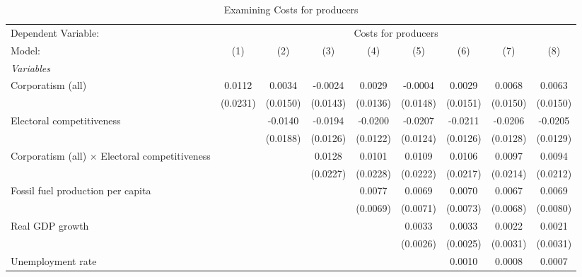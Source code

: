 
\begin{table}[htbp]
   \caption{Examining Costs for producers}
   \centering
   \begin{tabular}{lcccccccc}
      \tabularnewline \midrule \midrule
      Dependent Variable: & \multicolumn{8}{c}{Costs for producers}\\
      Model:                                                & (1)      & (2)      & (3)      & (4)      & (5)      & (6)      & (7)      & (8)\\  
      \midrule
      \emph{Variables}\\
      Corporatism (all)                                     & 0.0112   & 0.0034   & -0.0024  & 0.0029   & -0.0004  & 0.0029   & 0.0068   & 0.0063\\   
                                                            & (0.0231) & (0.0150) & (0.0143) & (0.0136) & (0.0148) & (0.0151) & (0.0150) & (0.0150)\\   
      Electoral competitiveness                             &          & -0.0140  & -0.0194  & -0.0200  & -0.0207  & -0.0211  & -0.0206  & -0.0205\\   
                                                            &          & (0.0188) & (0.0126) & (0.0122) & (0.0124) & (0.0126) & (0.0128) & (0.0129)\\   
      Corporatism (all) $\times$ Electoral competitiveness  &          &          & 0.0128   & 0.0101   & 0.0109   & 0.0106   & 0.0097   & 0.0094\\   
                                                            &          &          & (0.0227) & (0.0228) & (0.0222) & (0.0217) & (0.0214) & (0.0212)\\   
      Fossil fuel production per capita                     &          &          &          & 0.0077   & 0.0069   & 0.0070   & 0.0067   & 0.0069\\   
                                                            &          &          &          & (0.0069) & (0.0071) & (0.0073) & (0.0068) & (0.0080)\\   
      Real GDP growth                                       &          &          &          &          & 0.0033   & 0.0033   & 0.0022   & 0.0021\\   
                                                            &          &          &          &          & (0.0026) & (0.0025) & (0.0031) & (0.0031)\\   
      Unemployment rate                                     &          &          &          &          &          & 0.0010   & 0.0008   & 0.0007\\   

\end{tabular}
\end{table}
